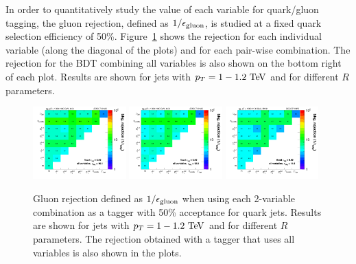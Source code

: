 In order to quantitatively study the value of each variable for quark/gluon tagging, the gluon 
rejection, defined as $1/\epsilon_{\rm gluon}$, is studied at a fixed quark selection efficiency
of 50\%. Figure~\ref{fig:qg_pt1000_comb} shows the rejection for each individual variable
(along the diagonal of the plots) and for each pair-wise combination. The rejection for the 
BDT combining all variables is also shown on the bottom right of each plot. Results are shown
for jets with $\pt=1-1.2 \TeV$ and for different $R$ parameters.
\begin{figure}
\begin{center}
\includegraphics[width=0.32\textwidth]{./Figures/QGTagging/pT1000/AKtR04/effBkg2D.png}
\includegraphics[width=0.32\textwidth]{./Figures/QGTagging/pT1000/AKtR08/effBkg2D.png}
\includegraphics[width=0.32\textwidth]{./Figures/QGTagging/pT1000/AKtR12/effBkg2D.png}
\caption{Gluon rejection defined as $1/\epsilon_{\rm gluon}$ when using each 2-variable combination 
as a tagger with 50\% acceptance for quark jets. Results are shown for jets with $\pt=1-1.2 \TeV$ and
for different $R$ parameters. The rejection obtained with a tagger that uses all variables is also shown
in the plots. }
\label{fig:qg_pt1000_comb}
\end{center}
\end{figure}
